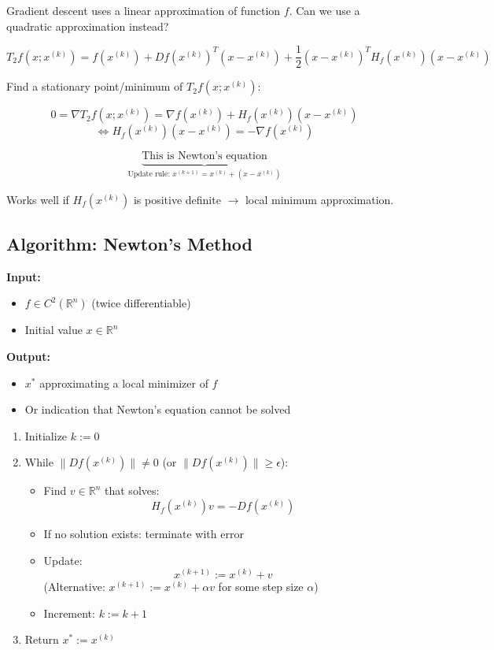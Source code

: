 \documentclass{article}
\begin{document}
    \vspace{5mm}
    Gradient descent uses a linear approximation of function $f$. Can we use a quadratic approximation instead?
    
    \[ T_2 f(x; x^{(k)}) = f(x^{(k)}) + Df(x^{(k)})^T (x - x^{(k)}) + \frac{1}{2} (x - x^{(k)})^T H_f(x^{(k)}) (x - x^{(k)}) \]
    
    Find a stationary point/minimum of $T_2 f(x; x^{(k)})$:
    
    \[ 0 = \nabla T_2 f(x; x^{(k)}) = \nabla f(x^{(k)}) + H_f(x^{(k)}) (x - x^{(k)}) \]
    \[ \Leftrightarrow H_f(x^{(k)}) (x - x^{(k)}) = -\nabla f(x^{(k)}) \]
    
    \[
    \underbrace{\text{This is Newton's equation}}_{\text{Update rule: } x^{(k+1)} = x^{(k)} + (x - x^{(k)})}
    \]
    
    Works well if $H_f(x^{(k)})$ is positive definite $\rightarrow$ local minimum approximation.
    
    \subsection*{Algorithm: Newton's Method}
    
    \textbf{Input:}
    \begin{itemize}
    \item $f \in C^2(\mathbb{R}^n)$ (twice differentiable)
    \item Initial value $x \in \mathbb{R}^n$
    \end{itemize}
    
    \textbf{Output:}
    \begin{itemize}
    \item $x^*$ approximating a local minimizer of $f$
    \item Or indication that Newton's equation cannot be solved
    \end{itemize}
    
    \begin{enumerate}
    \item Initialize $k := 0$
    \item While $\|Df(x^{(k)})\| \neq 0$ (or $\|Df(x^{(k)})\| \geq \epsilon$):
    \begin{itemize}
    \item Find $v \in \mathbb{R}^n$ that solves:
    \[ H_f(x^{(k)}) v = -Df(x^{(k)}) \]
    \item If no solution exists: terminate with error
    \item Update:
    \[ x^{(k+1)} := x^{(k)} + v \]
    (Alternative: $x^{(k+1)} := x^{(k)} + \alpha v$ for some step size $\alpha$)
    \item Increment: $k := k + 1$
    \end{itemize}
    \item Return $x^* := x^{(k)}$
    \end{enumerate}
\vspace{5mm}
\end{document}
